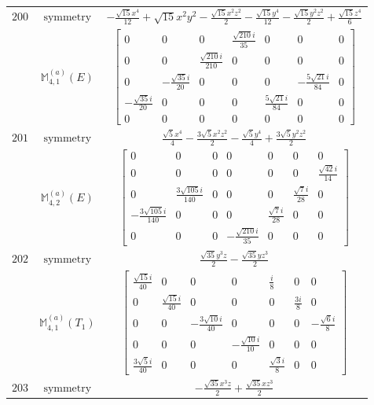 \documentclass[fleqn,8pt,landscape]{jsarticle}
\begin{document}
\begin{longtable}{ccc}
$ 200 $ & $ \text{symmetry} $ & $ - \frac{\sqrt{15} x^{4}}{12} + \sqrt{15} x^{2} y^{2} - \frac{\sqrt{15} x^{2} z^{2}}{2} - \frac{\sqrt{15} y^{4}}{12} - \frac{\sqrt{15} y^{2} z^{2}}{2} + \frac{\sqrt{15} z^{4}}{6} $ \\
$  $ & $ \mathbb{M}_{4,1}^{(a)}(E) $ & $ \begin{bmatrix} 0 & 0 & 0 & \frac{\sqrt{210} i}{35} & 0 & 0 & 0 \\ 0 & 0 & \frac{\sqrt{210} i}{210} & 0 & 0 & 0 & 0 \\ 0 & - \frac{\sqrt{35} i}{20} & 0 & 0 & 0 & - \frac{5 \sqrt{21} i}{84} & 0 \\ - \frac{\sqrt{35} i}{20} & 0 & 0 & 0 & \frac{5 \sqrt{21} i}{84} & 0 & 0 \\ 0 & 0 & 0 & 0 & 0 & 0 & 0 \end{bmatrix} $ \\ \hline
$ 201 $ & $ \text{symmetry} $ & $ \frac{\sqrt{5} x^{4}}{4} - \frac{3 \sqrt{5} x^{2} z^{2}}{2} - \frac{\sqrt{5} y^{4}}{4} + \frac{3 \sqrt{5} y^{2} z^{2}}{2} $ \\
$  $ & $ \mathbb{M}_{4,2}^{(a)}(E) $ & $ \begin{bmatrix} 0 & 0 & 0 & 0 & 0 & 0 & 0 \\ 0 & 0 & 0 & 0 & 0 & 0 & \frac{\sqrt{42} i}{14} \\ 0 & \frac{3 \sqrt{105} i}{140} & 0 & 0 & 0 & \frac{\sqrt{7} i}{28} & 0 \\ - \frac{3 \sqrt{105} i}{140} & 0 & 0 & 0 & \frac{\sqrt{7} i}{28} & 0 & 0 \\ 0 & 0 & 0 & - \frac{\sqrt{210} i}{35} & 0 & 0 & 0 \end{bmatrix} $ \\ \hline
$ 202 $ & $ \text{symmetry} $ & $ \frac{\sqrt{35} y^{3} z}{2} - \frac{\sqrt{35} y z^{3}}{2} $ \\
$  $ & $ \mathbb{M}_{4,1}^{(a)}(T_{1}) $ & $ \begin{bmatrix} \frac{\sqrt{15} i}{40} & 0 & 0 & 0 & \frac{i}{8} & 0 & 0 \\ 0 & \frac{\sqrt{15} i}{40} & 0 & 0 & 0 & \frac{3 i}{8} & 0 \\ 0 & 0 & - \frac{3 \sqrt{10} i}{40} & 0 & 0 & 0 & - \frac{\sqrt{6} i}{8} \\ 0 & 0 & 0 & - \frac{\sqrt{10} i}{10} & 0 & 0 & 0 \\ \frac{3 \sqrt{5} i}{40} & 0 & 0 & 0 & \frac{\sqrt{3} i}{8} & 0 & 0 \end{bmatrix} $ \\ \hline
$ 203 $ & $ \text{symmetry} $ & $ - \frac{\sqrt{35} x^{3} z}{2} + \frac{\sqrt{35} x z^{3}}{2} $ \\

\end{longtable}
\end{document}
